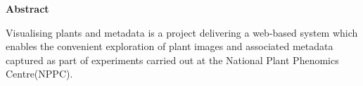 \thispagestyle{empty}

\begin{center}
    {\LARGE\bf Abstract}
\end{center}


Visualising plants and metadata is a project delivering a web-based system which enables the convenient exploration of plant images and associated metadata captured as part of experiments carried out at the National Plant Phenomics Centre(NPPC). 